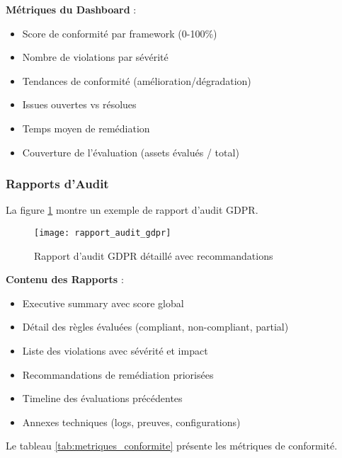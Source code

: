 \textbf{Métriques du Dashboard} :
\begin{itemize}
    \item Score de conformité par framework (0-100\%)
    \item Nombre de violations par sévérité
    \item Tendances de conformité (amélioration/dégradation)
    \item Issues ouvertes vs résolues
    \item Temps moyen de remédiation
    \item Couverture de l'évaluation (assets évalués / total)
\end{itemize}

\subsubsection{Rapports d'Audit}

La figure \ref{fig:rapport_audit_gdpr} montre un exemple de rapport d'audit GDPR.

\begin{figure}[htpb]
\centering
\texttt{[image: rapport\_audit\_gdpr]}
\caption{Rapport d'audit GDPR détaillé avec recommandations}
\label{fig:rapport_audit_gdpr}
\end{figure}

\textbf{Contenu des Rapports} :
\begin{itemize}
    \item Executive summary avec score global
    \item Détail des règles évaluées (compliant, non-compliant, partial)
    \item Liste des violations avec sévérité et impact
    \item Recommandations de remédiation priorisées
    \item Timeline des évaluations précédentes
    \item Annexes techniques (logs, preuves, configurations)
\end{itemize}

Le tableau \ref{tab:metriques_conformite} présente les métriques de conformité.

